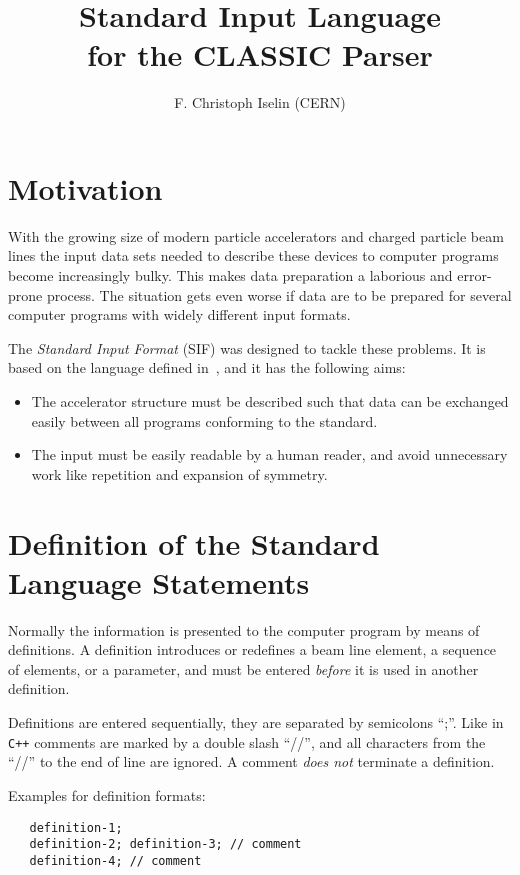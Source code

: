 \documentclass{article}
\begin{document}
\title{
  Standard Input Language \\
  for the CLASSIC Parser
}
\author{
  F. Christoph Iselin (CERN)
}

\maketitle

\section{Motivation}
With the growing size of modern particle accelerators and charged
particle beam lines the input data sets needed to describe these
devices to computer programs become increasingly bulky.
This makes data preparation a laborious and error-prone process.
The situation gets even worse if data are to be prepared for several
computer programs with widely different input formats.

The {\em Standard Input Format\/} (SIF) was designed to tackle these
problems.
It is based on the language defined in~\cite{snowmass},
and it has the following aims:
\begin{itemize}
\item
  The accelerator structure must be described such that data can be
  exchanged easily between all programs conforming to the standard.
\item
  The input must be easily readable by a human reader, and avoid
  unnecessary work like repetition and expansion of symmetry.
\end{itemize}

\section{Definition of the Standard Language Statements}
Normally the information is presented to the computer program by means
of definitions.
A definition introduces or redefines a beam line element, a sequence
of elements, or a parameter,
and must be entered {\em before} it is used in another definition.

Definitions are entered sequentially,
they are separated by semicolons ``;''.
Like in \verb'C++' comments are marked by a double slash ``//'',
and all characters from the ``//'' to the end of line are ignored.
A comment {\em does not} terminate a definition.

Examples for definition formats:
\begin{verbatim}
   definition-1;
   definition-2; definition-3; // comment
   definition-4; // comment
\end{verbatim}
\end{document}
